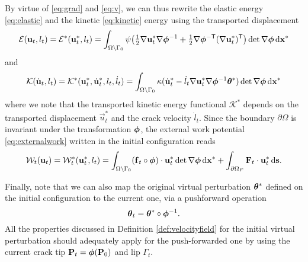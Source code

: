 By virtue of \eqref{eq:grad} and \eqref{eq:v}, we can thus rewrite the elastic  energy \eqref{eq:elastic} and the kinetic \eqref{eq:kinetic} energy using the transported displacement
\begin{equation} \label{eq:elastici}
\mathcal{E}(\vec{u}_t,l_t)=\mathcal{E}^*(\vec{u}_t^*,l_t)=\int_\domaini\psi\bigl({\textstyle\frac{1}{2}}\nabla\vec{u}_t^*\nabla\philt^{-1}+{\textstyle\frac{1}{2}}\nabla\philt^{-\mathsf{T}}(\nabla\vec{u}_t^*)^\mT\bigr)\det\nabla\philt\dxx
\end{equation}
and
\begin{equation} \label{eq:kinetici}
\mathcal{K}(\dot{\vec{u}}_t,l_t)=\mathcal{K}^*(\vec{u}_t^*,\dot{\vec{u}}_t^*,l_t,\dot{l}_t)=\int_\domaini\kappa(\dot{\vec{u}}_t^*-\dot{l}_t\nabla\vec{u}_t^*\nabla\philt^{-1}\vtheta^*)\det\nabla\philt\dxx
\end{equation}
where we note that the transported kinetic energy functional $\mathcal{K}^*$ depends on the transported displacement $\vec{u}_t^*$ and the crack velocity $\dot{l}_t$. Since the boundary $\partial\Omega$ is invariant under the transformation $\philt$, the external work potential \eqref{eq:externalwork} written in the initial configuration reads
\begin{equation} \label{eq:externalworki}
\mathcal{W}_t(\vec{u}_t)=\mathcal{W}^*_t(\vec{u}_t^*,l_t)=\int_\domaini (\vec{f}_t\circ\philt)\cdot\vec{u}_t^*\det\nabla\philt\dxx+\int_{\partial\Omega_F} \vec{F}_t\cdot\vec{u}_t^*\D{\vec{s}}.
\end{equation}

Finally, note that we can also map the original virtual perturbation $\vtheta^*$ defined on the initial configuration to the current one, via a pushforward operation
\[
\vtheta_t=\vtheta^*\circ\philt^{-1}.
\]
All the properties discussed in Definition \ref{def:velocityfield} for the initial virtual perturbation should adequately apply for the push-forwarded one by using the current crack tip $\vec{P}_t=\philt(\vec{P}_0)$ and lip $\Gamma_t$.

